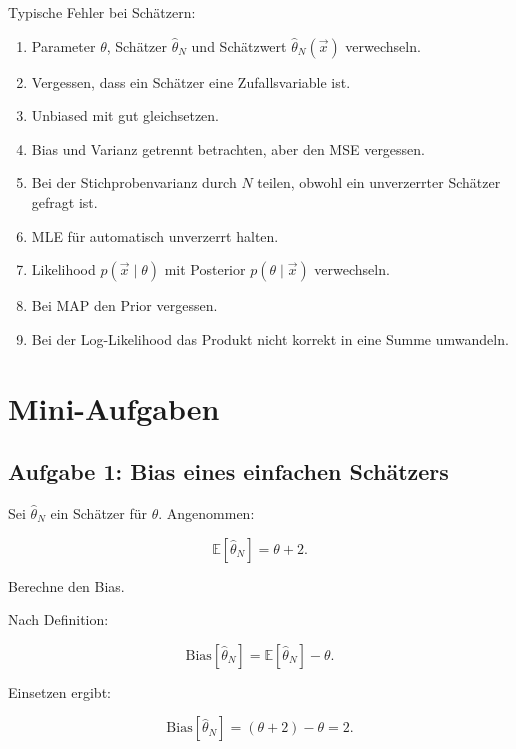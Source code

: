 \begin{examtipbox}
Typische Fehler bei Schätzern:

\begin{enumerate}
    \item Parameter \(\theta\), Schätzer \(\hat{\theta}_N\) und Schätzwert \(\hat{\theta}_N(\vec{x})\) verwechseln.
    \item Vergessen, dass ein Schätzer eine Zufallsvariable ist.
    \item Unbiased mit gut gleichsetzen.
    \item Bias und Varianz getrennt betrachten, aber den MSE vergessen.
    \item Bei der Stichprobenvarianz durch \(N\) teilen, obwohl ein unverzerrter Schätzer gefragt ist.
    \item MLE für automatisch unverzerrt halten.
    \item Likelihood \(p(\vec{x}\mid\theta)\) mit Posterior \(p(\theta\mid\vec{x})\) verwechseln.
    \item Bei MAP den Prior vergessen.
    \item Bei der Log-Likelihood das Produkt nicht korrekt in eine Summe umwandeln.
\end{enumerate}
\end{examtipbox}

\section{Mini-Aufgaben}

\subsection{Aufgabe 1: Bias eines einfachen Schätzers}

Sei \(\hat{\theta}_N\) ein Schätzer für \(\theta\).
Angenommen:

\[
    \mathbb{E}[\hat{\theta}_N]
    =
    \theta + 2.
\]

Berechne den Bias.

\begin{examplebox}
Nach Definition:

\[
    \mathrm{Bias}[\hat{\theta}_N]
    =
    \mathbb{E}[\hat{\theta}_N]
    -
    \theta.
\]

Einsetzen ergibt:

\[
    \mathrm{Bias}[\hat{\theta}_N]
    =
    (\theta+2)-\theta
    =
    2.
\]
\end{examplebox}

